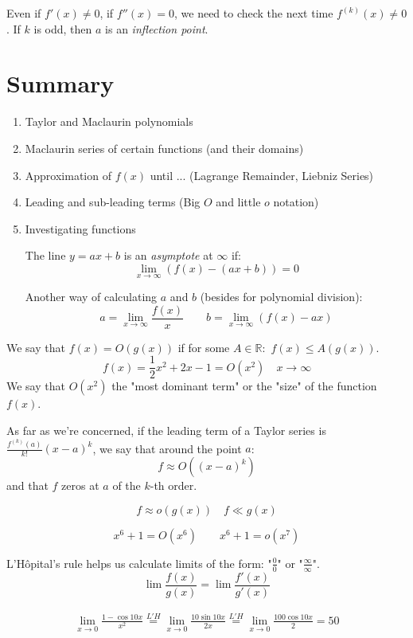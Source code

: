 \documentclass[00_complete]{subfiles}
\begin{document}
\begin{note}
    Even if $f'(x) \neq 0$, if $f''(x)=0$, we need to check the next time
    $f^{(k)}(x) \neq 0$. If $k$ is odd, then $a$ is an \emph{inflection point}.
\end{note}

\section{Summary}
\begin{enumerate}
\item Taylor and Maclaurin polynomials
\item Maclaurin series of certain functions (and their domains)
\item Approximation of $f(x)$ until ... (Lagrange Remainder, Liebniz Series)
\item Leading and sub-leading terms (Big $O$ and little $o$ notation)
\item Investigating functions

    The line $y=ax+b$ is an \emph{asymptote} at $\infty$ if:
    $$\lim\limits_{x \to \infty} (f(x)-(ax+b)) = 0$$

    Another way of calculating $a$ and $b$ (besides for polynomial division):
    $$a=\lim\limits_{x \to \infty} \frac{f(x)}{x} \quad \quad
    b = \lim\limits_{x \to \infty} (f(x)-ax)$$
\end{enumerate}

\begin{definition}
    We say that $f(x)=O(g(x))$ if for some $A \in \mathbb{R}:$ $f(x) \leq
    A(g(x))$.
    $$f(x)=\frac{1}{2}x^2+2x-1 = O(x^2) \quad x \to \infty$$
    We say that $O(x^2)$ the "most dominant term" or the "size" of the function
    $f(x)$.

    As far as we're concerned, if the leading term of a Taylor series is
    $\frac{f^{(k)}(a)}{k!}(x-a)^k$, we say that around the point $a$:
    $$f \approx O((x-a)^k)$$
    and that $f$ zeros at $a$ of the $k$-th order.
\end{definition}
\begin{definition}
        $$f \approx o(g(x)) \quad f \ll g(x)$$
\end{definition}
\begin{example}
    $$x^6+1 = O(x^6) \quad \quad x^6+1 = o(x^7)$$
\end{example}
\begin{definition}

    L'H\^{o}pital's rule helps us calculate limits of the form: "$\frac{0}{0}$"
    or "$\frac{\infty}{\infty}$".
    $$\lim \frac{f(x)}{g(x)} = \lim \frac{f'(x)}{g'(x)}$$
    \begin{example}
        $$
        \begin{gathered}
            \lim\limits_{x \to 0} \frac{1-\cos 10x}{x^2} \overset{L'H}{=}
            \lim\limits_{x \to 0} \frac{10\sin 10x}{2x}  \overset{L'H}{=}
            \lim\limits_{x \to 0} \frac{100\cos 10x}{2} = 50
        \end{gathered}
        $$
    \end{example}
\end{definition}
\end{document}
